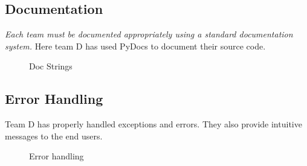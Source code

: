 \subsection{Documentation}
\begin{flushleft}
  \textit{Each team must be documented appropriately using a standard documentation system.}\newline
    Here team D has used PyDocs to document their source code.
    \begin{figure}[h!]
        \centering
        \vspace{.5cm}
        \caption{Doc Strings}
        \label{fig:docstrings }
    \end{figure}
\end{flushleft}
\vspace*{1em}
\subsection{Error Handling}
\begin{flushleft}
    Team D has properly handled exceptions and errors. They also provide intuitive messages to the end users.
    \begin{figure}[h!]
        \centering
        \vspace{.5cm}
        \caption{Error handling}
        \label{fig:errpr handelling }
    \end{figure}
\end{flushleft}
